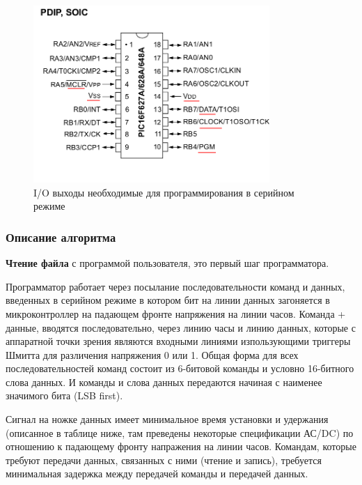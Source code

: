 \begin{figure}[h!]
    \centering
    \includegraphics[width=0.8\textwidth]{2017-05-07_at_22:31:52_screenshot.png}
    \caption{I/O выходы необходимые для программирования в серийном режиме}
\end{figure}


\subsubsection{Описание алгоритма}

\textbf{Чтение файла} с программой пользователя, это первый шаг программатора. 

Программатор работает через посылание 
последовательности команд и данных, введенных в серийном режиме
в котором бит на линии данных загоняется в микроконтроллер на падающем
фронте напряжения на линии часов. Команда + данные, вводятся последовательно, 
через линию часы и линию данных, которые с аппаратной точки зрения являются входными линиями 
изпользующими триггеры Шмитта для различения напряжения 0 или 1. 
Общая форма для всех последовательностей команд
состоит из 6-битовой команды и условно 16-битного
слова данных. И команды и слова данных передаются начиная с наименее значимого бита (LSB first).

Сигнал на ножке данных имеет минимальное время установки и удержания 
(описанное в таблице ниже, там преведены некоторые спецификации АС/DC) по
отношению к падающему фронту напражения на линии часов. Командам, которые
требуют передачи данных, связанных с ними (чтение и запись),
требуется минимальная задержка между передачей команды и передачей данных.


